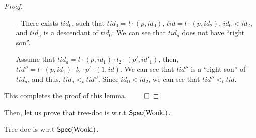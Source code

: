 \begin {proof}
\begin{itemize}
\begin{itemize}
    $tid'' = l \cdot (p,id_1) \cdot (1,id)$. Since $tid''$ is a ``right son'' of $tid_a$, we can see that $tid_a <_t tid''$. Since $id_1 < id_2$, we can see that $tid'' <_t tid$.

    \item[-] There exists $tid_0$, such that $tid_0 = l \cdot (p,id_0)$, $tid = l \cdot (p,id_2)$, $id_0 < id_2$, and $tid_a$ is a descendant of $tid_0$: We can see that $tid_a$ does not have ``right son''.

    Assume that $tid_a = l \cdot (p,id_1) \cdot l_2 \cdot (p',id'_1)$, then, $tid'' = l \cdot (p,id_1) \cdot l_2 \cdot p' \cdot (1,id)$. We can see that $tid''$ is a ``right son'' of $tid_a$, and thus, $tid_a <_t tid''$. Since $id_0 < id_2$, we can see that $tid'' <_t tid$.
    \end{itemize}

\end{itemize}

This completes the proof of this lemma. $\qed$
\end {proof}


Then, let us prove that tree-doc is \crdtlinearizable{} w.r.t $\mathsf{Spec}(\text{Wooki})$.

\begin{lemma}
\label{lemma:tree-doc is correct}
Tree-doc is \crdtlinearizable{} w.r.t $\mathsf{Spec}(\text{Wooki})$.
\end{lemma}

